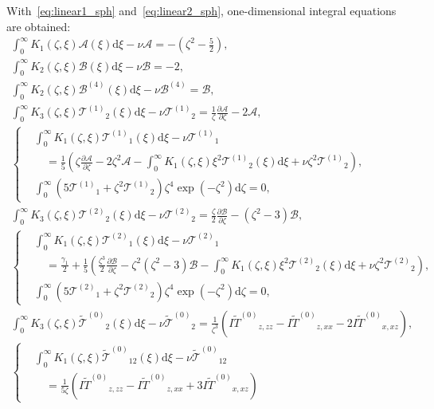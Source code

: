 \documentclass[]{elsarticle} %
\newcommand{\dd}{\mathrm{d}}
\newcommand{\pder}[2][]{\frac{\partial#1}{\partial#2}}
\newcommand{\B}{\ensuremath{\mathcal{B}^{(4)}}}
\newcommand{\T}[1]{\ensuremath{\mathcal{T}^{(#1)}}}
\newcommand{\TT}{\ensuremath{\tilde{\mathcal{T}}^{(0)}}}
\newcommand{\IFF}[1]{\ensuremath{I\tilde{#1}^{(0)}}}
\begin{document}
With~\eqref{eq:linear1_sph} and~\eqref{eq:linear2_sph}, one-dimensional integral equations are obtained:
\begin{gather}
    \int_0^\infty K_1(\zeta,\xi)\mathcal{A}(\xi)\dd\xi - \nu\mathcal{A} = -\left(\zeta^2-\frac52\right), \label{eq:A_1d}\\
    \int_0^\infty K_2(\zeta,\xi)\mathcal{B}(\xi)\dd\xi - \nu\mathcal{B} = -2, \\
    \int_0^\infty K_2(\zeta,\xi)\B(\xi)\dd\xi - \nu\B = \mathcal{B}, \\
    \int_0^\infty K_3(\zeta,\xi)\T{1}_2(\xi)\dd\xi - \nu\T{1}_2
        = \frac1\zeta\pder[\mathcal{A}]{\zeta} - 2\mathcal{A}, \\
    \left\{\begin{aligned}
    &\int_0^\infty K_1(\zeta,\xi)\T{1}_1(\xi)\dd\xi - \nu\T{1}_1 \\
        &\quad = \frac15\left( \zeta\pder[\mathcal{A}]{\zeta} - 2\zeta^2\mathcal{A}
        - \int_0^\infty K_1(\zeta,\xi)\xi^2\T{1}_2(\xi)\dd\xi
        + \nu\zeta^2\T{1}_2 \right), \\
    &\int_0^\infty \left( 5\T{1}_1 + \zeta^2\T{1}_2 \right) \zeta^4 \exp(-\zeta^2)\dd\zeta = 0,
    \end{aligned}\right.\\
    \int_0^\infty K_3(\zeta,\xi)\T{2}_2(\xi)\dd\xi - \nu\T{2}_2
        = \frac\zeta2\pder[\mathcal{B}]{\zeta} - \left(\zeta^2-3\right)\mathcal{B}, \\
    \left\{\begin{aligned}
    &\int_0^\infty K_1(\zeta,\xi)\T{2}_1(\xi)\dd\xi - \nu\T{2}_1 \\
        &\quad = \frac{\gamma_1}2 + \frac15\left( \frac{\zeta^3}2\pder[\mathcal{B}]{\zeta}
        - \zeta^2\left(\zeta^2-3\right)\mathcal{B}
        - \int_0^\infty K_1(\zeta,\xi)\xi^2\T{2}_2(\xi)\dd\xi
        + \nu\zeta^2\T{2}_2 \right), \\
    &\int_0^\infty \left( 5\T{2}_1 + \zeta^2\T{2}_2 \right) \zeta^4 \exp(-\zeta^2)\dd\zeta = 0,
    \end{aligned}\right.\\
    \int_0^\infty K_3(\zeta,\xi)\TT_2(\xi)\dd\xi - \nu\TT_2
        = \frac1{\zeta^3}\left(\IFF{T}_{z,zz} - \IFF{T}_{z,xx} - 2\IFF{T}_{x,xz}\right), \\
    \left\{\begin{aligned}
    &\int_0^\infty K_1(\zeta,\xi)\TT_{12}(\xi)\dd\xi - \nu\TT_{12} \\
        &\quad = \frac1{5\zeta}\left(\IFF{T}_{z,zz} - \IFF{T}_{z,xx} + 3\IFF{T}_{x,xz}\right)

\end{aligned}
\end{gather}
\end{document}
